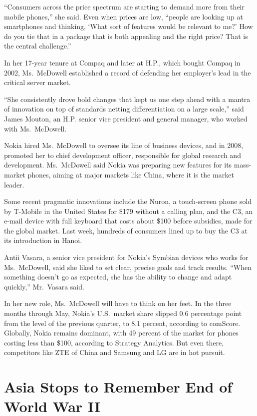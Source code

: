 ﻿\documentclass[12pt]{article}
\begin{document}
``Consumers across the price spectrum are starting to demand more from their mobile phones,'' she
said. Even when prices are low, ``people are looking up at smartphones and thinking, `What sort of
features would be relevant to me?' How do you tie that in a package that is both appealing and the
right price? That is the central challenge.''

In her 17-year tenure at Compaq and later at H.P., which bought Compaq in 2002, Ms.~McDowell
established a record of defending her employer's lead in the critical server market.

``She consistently drove bold changes that kept us one step ahead with a mantra of innovation on top
of standards netting differentiation on a large scale,'' said James Mouton, an H.P. senior vice
president and general manager, who worked with Ms.~McDowell.

Nokia hired Ms.~McDowell to oversee its line of business devices, and in 2008, promoted her to chief
development officer, responsible for global research and development. Ms.~McDowell said Nokia was
preparing new features for its mass-market phones, aiming at major markets like China, where it is
the market leader.

Some recent pragmatic innovations include the Nuron, a touch-screen phone sold by T-Mobile in the
United States for \$179 without a calling plan, and the C3, an e-mail device with full keyboard that
costs about \$100 before subsidies, made for the global market. Last week, hundreds of consumers
lined up to buy the C3 at its introduction in Hanoi.

Antii Vasara, a senior vice president for Nokia's Symbian devices who works for Ms.~McDowell, said
she liked to set clear, precise goals and track results. ``When something doesn't go as expected,
she has the ability to change and adapt quickly,'' Mr.~Vasara said.

In her new role, Ms.~McDowell will have to think on her feet. In the three months through May,
Nokia's U.S.~market share slipped 0.6 percentage point from the level of the previous quarter, to
8.1 percent, according to comScore. Globally, Nokia remains dominant, with 49 percent of the market
for phones costing less than \$100, according to Strategy Analytics. But even there, competitors
like ZTE of China and Samsung and LG are in hot pursuit.

\section{Asia Stops to Remember End of World War II}
\end{document}
